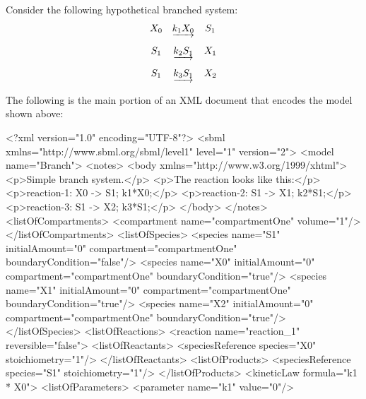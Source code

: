 \documentclass[10pt]{cekarticle}
\newcommand{\changed}[1]{\textcolor{BrickRed}{#1}}
\begin{document}
Consider the following hypothetical branched system:
\begin{equation*}
  \begin{array}{@{}ccc@{}}
    X_0 & \underrightarrow{k_1 X_0} & S_1 \\ \\[-4pt]
    S_1 & \underrightarrow{k_2 S_1} & X_1 \\ \\[-4pt]
    S_1 & \underrightarrow{k_3 S_1} & X_2
  \end{array}
\end{equation*}

The following is the main portion of an XML document that encodes the model
shown above:

\clearpage


\begin{example}
<?xml version="1.0" encoding="UTF-8"?>
<sbml xmlns="http://www.sbml.org/sbml/level1" level="1" version="\changed{2}">
    <model name="Branch">
        <notes>
            <body xmlns="http://www.w3.org/1999/xhtml">
                <p>Simple branch system.</p>
                <p>The reaction looks like this:</p>
                <p>reaction-1:   X0 -> S1; k1*X0;</p>
                <p>reaction-2:   S1 -> X1; k2*S1;</p>
                <p>reaction-3:   S1 -> X2; k3*S1;</p>
            </body>
        </notes>
        <listOfCompartments>
            <compartment name="compartmentOne" volume="1"/>
        </listOfCompartments>
        <listOfSpecies>
            <\changed{species} name="S1" initialAmount="0" compartment="compartmentOne"
                     boundaryCondition="false"/>
            <\changed{species} name="X0" initialAmount="0" compartment="compartmentOne"
                     boundaryCondition="true"/>
            <\changed{species} name="X1" initialAmount="0" compartment="compartmentOne"
                     boundaryCondition="true"/>
            <\changed{species} name="X2" initialAmount="0" compartment="compartmentOne"
                     boundaryCondition="true"/>
        </listOfSpecies>
        <listOfReactions>
            <reaction name="reaction_1" reversible="false">
                <listOfReactants>
                    <\changed{speciesReference} \changed{species=}"X0" stoichiometry="1"/>
                </listOfReactants>
                <listOfProducts>
                    <\changed{speciesReference} \changed{species=}"S1" stoichiometry="1"/>
                </listOfProducts>
                <kineticLaw formula="k1 * X0">
                    <listOfParameters>
                        <parameter name="k1" value="0"/>

\end{example}
\end{document}
